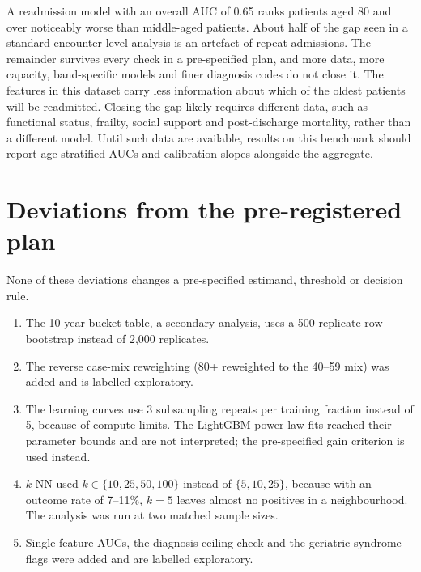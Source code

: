 \documentclass{article}
\begin{document}
A readmission model with an overall AUC of 0.65 ranks patients aged 80 and over noticeably worse than middle-aged patients. About half of the gap seen in a standard encounter-level analysis is an artefact of repeat admissions. The remainder survives every check in a pre-specified plan, and more data, more capacity, band-specific models and finer diagnosis codes do not close it. The features in this dataset carry less information about which of the oldest patients will be readmitted. Closing the gap likely requires different data, such as functional status, frailty, social support and post-discharge mortality, rather than a different model. Until such data are available, results on this benchmark should report age-stratified AUCs and calibration slopes alongside the aggregate.

\appendix
\section{Deviations from the pre-registered plan}
\label{app:deviations}
None of these deviations changes a pre-specified estimand, threshold or decision rule.
\begin{enumerate}
  \item The 10-year-bucket table, a secondary analysis, uses a 500-replicate row bootstrap instead of 2,000 replicates.
  \item The reverse case-mix reweighting (80+ reweighted to the 40--59 mix) was added and is labelled exploratory.
  \item The learning curves use 3 subsampling repeats per training fraction instead of 5, because of compute limits. The LightGBM power-law fits reached their parameter bounds and are not interpreted; the pre-specified gain criterion is used instead.
  \item $k$-NN used $k \in \{10, 25, 50, 100\}$ instead of $\{5, 10, 25\}$, because with an outcome rate of 7--11\%, $k = 5$ leaves almost no positives in a neighbourhood. The analysis was run at two matched sample sizes.
  \item Single-feature AUCs, the diagnosis-ceiling check and the geriatric-syndrome flags were added and are labelled exploratory.
\end{enumerate}
\end{document}
